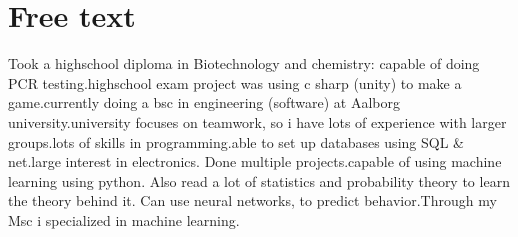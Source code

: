 \section*{Free text}
Took a highschool diploma in Biotechnology and chemistry: capable of doing PCR testing.\newline highschool exam project was using c sharp (unity) to make a game.\newline currently doing a bsc in engineering (software) at Aalborg university.\newline university focuses on teamwork, so i have lots of experience with larger groups.\newline lots of skills in programming.\newline able to set up databases using SQL & net.\newline large interest in electronics. Done multiple projects.\newline capable of using machine learning using python. Also read a lot of statistics and probability theory to learn the theory behind it. Can use neural networks, to predict behavior.\newline Through my Msc i specialized in machine learning.\newline 
